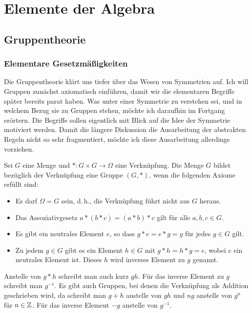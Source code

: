 
\chapter{Elemente der Algebra}

\section{Gruppentheorie}

\subsection{Elementare Gesetzmäßigkeiten}

Die Gruppentheorie klärt uns tiefer über das Wesen von Symmetrien auf.
Ich will Gruppen zunächst axiomatisch einführen, damit wir die
elementaren Begriffe später bereits parat haben. Was unter einer
Symmetrie zu verstehen sei, und in welchem Bezug sie zu Gruppen stehen,
möchte ich daraufhin im Fortgang erörtern. Die Begriffe sollen eigentlich
mit Blick auf die Idee der Symmetrie motiviert werden. Damit die längere
Diskussion die Ausarbeitung der abstrakten Regeln nicht so sehr
fragmentiert, möchte ich diese Ausarbeitung allerdings vorziehen.

\begin{Definition}[Gruppe]\newlinefirst
Sei $G$ eine Menge und $*\colon G\times G\to\Omega$ eine Verknüpfung.
Die Menge $G$ bildet bezüglich der Verknüpfung eine Gruppe $(G,*)$,
wenn die folgenden Axiome erfüllt sind:
\begin{itemize}
\item[\strong{(E)}]
Es darf $\Omega=G$ sein, d.\,h., die Verknüpfung führt nicht aus $G$ heraus.
\item[\strong{(A)}]
Das Assoziativgesetz $a*(b*c)=(a*b)*c$ gilt für alle $a,b,c\in G$.
\item[\strong{(N)}]
Es gibt ein neutrales Element $e$, so dass $g*e=e*g=g$ für jedes
$g\in G$ gilt.
\item[\strong{(I)}]
Zu jedem $g\in G$ gibt es ein Element $h\in G$ mit $g*h=h*g=e$,
wobei $e$ ein neutrales Element ist. Dieses $h$ wird
inverses Element zu $g$ genannt.
\end{itemize}
\end{Definition}
Anstelle von $g*h$ schreibt man auch kurz $gh$. Für das inverse Element
zu $g$ schreibt man $g^{-1}$. Es gibt auch Gruppen,
bei denen die Verknüpfung als Addition geschrieben wird, da schreibt
man $g+h$ anstelle von $gh$ und $ng$ anstelle von $g^n$ für $n\in\mathbb Z$.
Für das inverse Element $-g$ anstelle von $g^{-1}$.

